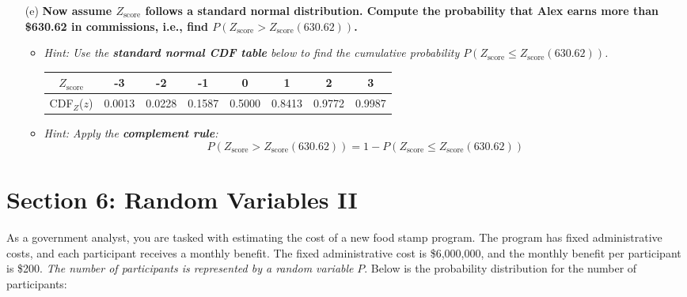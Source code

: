 \documentclass{article}
\newcommand{\blankbox}[2][3cm]{%
    \vspace{-0.5em}
    \begin{figure}[H]
        \makebox[\linewidth]{%
            \begin{tcolorbox}[
                colback=white, 
                colframe=black, 
                width=#2, %
                height=#1,
                boxrule=0.2mm
            ]
            \end{tcolorbox}
        }
    \end{figure}
    \vspace{-1em}
}
\begin{document}
\begin{enumerate}
\begin{enumerate}
        \item[(e)] \textbf{Now assume \( Z_{\text{score}} \) follows a standard normal distribution. Compute the probability that Alex earns more than \$630.62 in commissions, i.e., find \( P(Z_{\text{score}} > Z_{\text{score}}(630.62)) \).}  
        \begin{itemize}
            \item \emph{Hint: Use the \textbf{standard normal CDF table} below to find the cumulative probability \( P(Z_{\text{score}} \leq Z_{\text{score}}(630.62)) \).}
        \begin{center}
        \begin{tabular}{c|c c c c c c c}
        \( Z_{\text{score}} \)  & -3  & -2  & -1  &  0  &  1  &  2  &  3  \\
        \hline
        CDF$_Z$(\(z\))  & 0.0013 & 0.0228 & 0.1587 & 0.5000 & 0.8413 & 0.9772 & 0.9987 \\
        \end{tabular}
        \end{center}
            \item \emph{Hint: Apply the \textbf{complement rule}:}
            \[
            P(Z_{\text{score}} > Z_{\text{score}}(630.62)) = 1 - P(Z_{\text{score}} \leq Z_{\text{score}}(630.62))
            \]
        \end{itemize}
        \blankbox[5cm]{1.1\textwidth}

      
    \end{enumerate}

\end{enumerate}

\newpage
\section*{Section 6: Random Variables II}

As a government analyst, you are tasked with estimating the cost of a new food stamp program. The program has fixed administrative costs, and each participant receives a monthly benefit. The fixed administrative cost is \$6,000,000, and the monthly benefit per participant is \$200. \emph{The number of participants is represented by a random variable} $P$. Below is the probability distribution for the number of participants:
\end{document}
